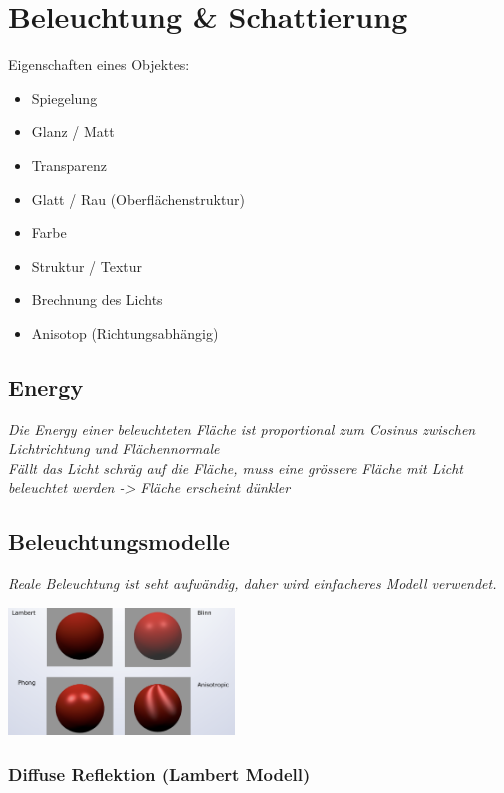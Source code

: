 \section{Beleuchtung \& Schattierung}

Eigenschaften eines Objektes:
\begin{itemize}
    \item Spiegelung
    \item Glanz / Matt
    \item Transparenz
    \item Glatt / Rau (Oberflächenstruktur)
    \item Farbe
    \item Struktur / Textur
    \item Brechnung des Lichts
    \item Anisotop (Richtungsabhängig)
\end{itemize}

\subsection{Energy}

\textit{Die Energy einer beleuchteten Fläche ist proportional zum Cosinus
zwischen Lichtrichtung und Flächennormale}\\

\textit{Fällt das Licht schräg auf die Fläche, muss eine grössere
Fläche mit Licht beleuchtet werden -> Fläche erscheint dünkler}

\subsection{Beleuchtungsmodelle}

\textit{Reale Beleuchtung ist seht aufwändig, daher wird einfacheres Modell verwendet.}

\includegraphics[width=0.45\textwidth]{assets/Beleuchtungsmodelle.png}

\subsubsection{Diffuse Reflektion (Lambert Modell)}

